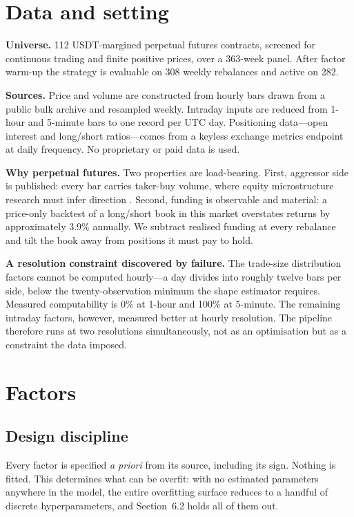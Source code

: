 \documentclass[11pt,letterpaper]{article}
\begin{document}
\section{Data and setting}

\textbf{Universe.} 112 USDT-margined perpetual futures contracts, screened for
continuous trading and finite positive prices, over a 363-week panel. After
factor warm-up the strategy is evaluable on 308 weekly rebalances and active on
282.

\textbf{Sources.} Price and volume are constructed from hourly bars drawn from a
public bulk archive and resampled weekly. Intraday inputs are reduced from
1-hour and 5-minute bars to one record per UTC day. Positioning data---open
interest and long/short ratios---comes from a keyless exchange metrics endpoint
at daily frequency. No proprietary or paid data is used.

\textbf{Why perpetual futures.} Two properties are load-bearing. First,
aggressor side is published: every bar carries taker-buy volume, where equity
microstructure research must infer direction \citep{leeready1991}. Second,
funding is observable and material: a price-only backtest of a long/short book
in this market overstates returns by approximately 3.9\% annually. We subtract
realised funding at every rebalance and tilt the book away from positions it
must pay to hold.

\textbf{A resolution constraint discovered by failure.} The trade-size
distribution factors cannot be computed hourly---a day divides into roughly
twelve bars per side, below the twenty-observation minimum the shape estimator
requires. Measured computability is 0\% at 1-hour and 100\% at 5-minute. The
remaining intraday factors, however, measured better at hourly resolution. The
pipeline therefore runs at two resolutions simultaneously, not as an
optimisation but as a constraint the data imposed.

\section{Factors}

\subsection{Design discipline}

Every factor is specified \emph{a priori} from its source, including its sign.
Nothing is fitted. This determines what can be overfit: with no estimated
parameters anywhere in the model, the entire overfitting surface reduces to a
handful of discrete hyperparameters, and Section~6.2 holds all of them out.
\end{document}
